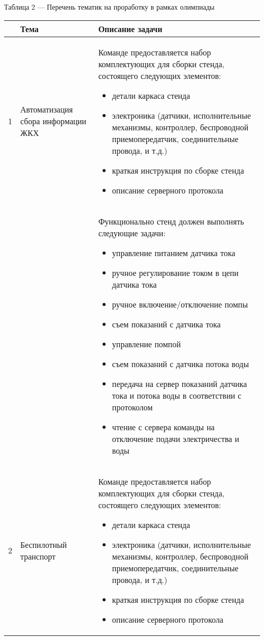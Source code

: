 \begin{center}
    Таблица 2 — Перечень тематик на проработку в рамках олимпиады
\end{center}
\begin{longtable}{|c|p{6cm}|p{8cm}|}
    \hline
    & Тема & Описание задачи \\
    \hline
    1 & Автоматизация сбора информации ЖКХ & 

    Команде предоставляется набор комплектующих для сборки стенда, состоящего следующих элементов:
    \begin{itemize}
        \item детали каркаса стенда
        \item электроника (датчики, исполнительные механизмы, контроллер, беспроводной приемопередатчик, соединительные провода, и т.д.)
        \item краткая инструкция по сборке стенда
        \item описание серверного протокола        
    \end{itemize} \\
    \hline
    & & Функционально стенд должен выполнять следующие задачи:
    
    \begin{itemize}
        \item управление питанием датчика тока
        \item ручное регулирование током в цепи датчика тока
        \item ручное включение/отключение помпы
        \item съем показаний с датчика тока
        \item управление помпой
        \item съем показаний с датчика потока воды
        \item передача на сервер показаний датчика тока и потока воды в соответствии с протоколом
        \item чтение с сервера команды на отключение подачи электричества и воды
    \end{itemize} \\
    \hline

    2 & Беспилотный транспорт & 
    
    Команде предоставляется набор комплектующих для сборки стенда, состоящего следующих элементов: 

    \begin{itemize}
        \item детали каркаса стенда
        \item электроника (датчики, исполнительные механизмы, контроллер, беспроводной приемопередатчик, соединительные провода, и т.д.)
        \item краткая инструкция по сборке стенда
        \item описание серверного протокола                
    \end{itemize}
    

\end{longtable}
